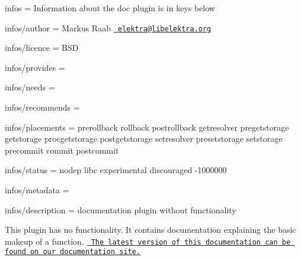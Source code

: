 
\begin{DoxyItemize}
\item infos = Information about the doc plugin is in keys below
\item infos/author = Markus Raab \href{mailto:elektra@libelektra.org}{\texttt{ elektra@libelektra.\+org}}
\item infos/licence = B\+SD
\item infos/provides =
\item infos/needs =
\item infos/recommends =
\item infos/placements = prerollback rollback postrollback getresolver pregetstorage getstorage procgetstorage postgetstorage setresolver presetstorage setstorage precommit commit postcommit
\item infos/status = nodep libc experimental discouraged -\/1000000
\item infos/metadata =
\item infos/description = documentation plugin without functionality
\end{DoxyItemize}

This plugin has no functionality. It contains documentation explaining the basic makeup of a function. \href{https://doc.libelektra.org/api/latest/html/group__plugin.html}{\texttt{ The latest version of this documentation can be found on our documentation site.}} 